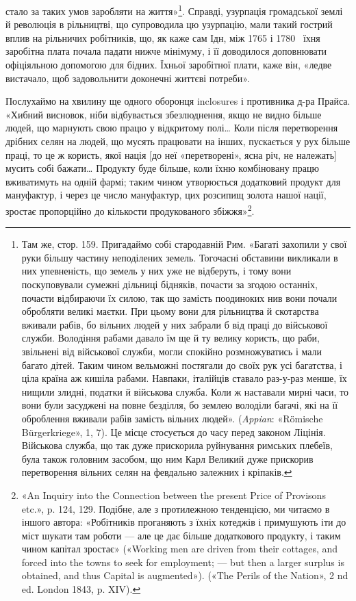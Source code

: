 стало за таких умов заробляти на життя»\footnote{
Там же, стор. 159. Пригадаймо собі стародавній Рим. «Багаті
захопили у свої руки більшу частину неподілених земель. Тогочасні
обставини викликали в них упевненість, що земель у них уже не відберуть,
і тому вони поскуповували сумежні дільниці бідняків, почасти за
згодою останніх, почасти відбираючи їх силою, так що замість поодиноких
нив вони почали обробляти великі маєтки. При цьому вони для
рільництва й скотарства вживали рабів, бо вільних людей у них забрали б
від праці до військової служби. Володіння рабами давало їм ще й ту
велику користь, що раби, звільнені від військової служби, могли спокійно
розмножуватись і мали багато дітей. Таким чином вельможні постягали
до своїх рук усі багатства, і ціла країна аж кишіла рабами. Навпаки,
італійців ставало раз-у-раз менше, їх нищили злидні, податки й військова
служба. Коли ж наставали мирні часи, то вони були засуджені
на повне безділля, бо землею володіли багачі, які на її оброблення вживали
рабів замість вільних людей». (\emph{Appian}: «Römische Bürgerkriege»,
1, 7). Це місце стосується до часу перед законом Ліцінія. Військова служба,
що так дуже прискорила руйнування римських плебеїв, була також
головним засобом, що ним Карл Великий дуже прискорив перетворення
вільних селян на февдально залежних і кріпаків.
}. Справді, узурпація
громадської землі й революція в рільництві, що супроводила
цю узурпацію, мали такий гострий вплив на рільничих робітників,
що, як каже сам Ідн, між 1765 і 1780~ їхня заробітна
\parcont{}
плата почала падати нижче мінімуму, і її доводилося доповнювати
офіціяльною допомогою для бідних. Їхньої заробітної плати,
каже він, «ледве вистачало, щоб задовольнити доконечні життєві
потреби».

Послухаймо на хвилину ще одного оборонця inclosures і противника
д-ра Прайса. «Хибний висновок, ніби відбувається
збезлюднення, якщо не видно більше людей, що марнують свою
працю у відкритому полі\dots{} Коли після перетворення дрібних
селян на людей, що мусять працювати на інших, пускається у
рух більше праці, то це ж користь, якої нація [до неї «перетворені»,
ясна річ, не належать] мусить собі бажати\dots{} Продукту
буде більше, коли їхню комбіновану працю вживатимуть на
одній фармі; таким чином утворюється додатковий продукт для
мануфактур, і через це число мануфактур, цих розсипищ золота
нашої нації, зростає пропорційно до кількости продукованого
збіжжя»\footnote{
«An Inquiry into the Connection between the present Price of
Provisons etc.», p. 124, 129. Подібне, але з протилежною тенденцією, ми
читаємо в іншого автора: «Робітників проганяють з їхніх котеджів і
примушують іти до міст шукати там роботи — але це дає більше додаткового
продукту, і таким чином капітал зростає» («Working men are driven
from their cottages, and forced into the towns to seek for employment; —
but then a larger surplus is obtained, and thus Capital is augmented»).
(«The Perils of the Nation», 2 nd ed. London 1843, p. XIV).
}.

